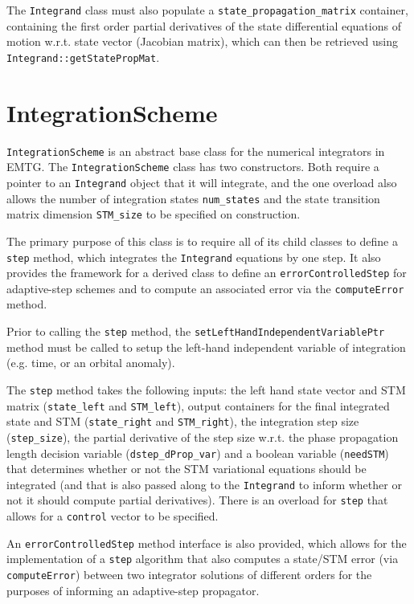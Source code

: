 The \texttt{Integrand} class must also populate a \texttt{state\_propagation\_matrix} container, containing the first order partial derivatives of the state differential equations of motion w.r.t. state vector (Jacobian matrix), which can then be retrieved using \texttt{Integrand::getStatePropMat}. 


\section{IntegrationScheme}
\label{sec:IntegrationScheme}

\texttt{IntegrationScheme} is an abstract base class for the numerical integrators in EMTG. The \texttt{IntegrationScheme} class has two constructors. Both require a pointer to an \texttt{Integrand} object that it will integrate, and the one overload also allows the number of integration states \texttt{num\_states} and the state transition matrix dimension \texttt{STM\_size} to be specified on construction.

The primary purpose of this class is to require all of its child classes to define a \texttt{step} method, which integrates the \texttt{Integrand} equations by one step. It also provides the framework for a derived class to define an \texttt{errorControlledStep} for adaptive-step schemes and to compute an associated error via the \texttt{computeError} method.

Prior to calling the \texttt{step} method, the \texttt{setLeftHandIndependentVariablePtr} method must be called to setup the left-hand independent variable of integration (e.g. time, or an orbital anomaly).

The \texttt{step} method takes the following inputs: the left hand state vector and STM matrix (\texttt{state\_left} and \texttt{STM\_left}), output containers for the final integrated state and STM (\texttt{state\_right} and \texttt{STM\_right}), the integration step size (\texttt{step\_size}), the partial derivative of the step size w.r.t. the phase propagation length decision variable (\texttt{dstep\_dProp\_var}) and a boolean variable (\texttt{needSTM}) that determines whether or not the STM variational equations should be integrated (and that is also passed along to the \texttt{Integrand} to inform whether or not it should compute partial derivatives). There is an overload for \texttt{step} that allows for a \texttt{control} vector to be specified.

An \texttt{errorControlledStep} method interface is also provided, which allows for the implementation of a \texttt{step} algorithm that also computes a state/STM error (via \texttt{computeError}) between two integrator solutions of different orders for the purposes of informing an adaptive-step propagator.

